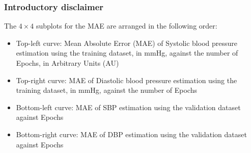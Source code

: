 \subsubsection{Introductory disclaimer}
The $4 \times 4$ subplots for the MAE are arranged in the following order:
\begin{itemize}
    \item Top-left curve: Mean Absolute Error (MAE) of Systolic blood pressure estimation using the training dataset, in mmHg, against the number of Epochs, in Arbitrary Units (AU)
    \item Top-right curve: MAE of Diastolic blood pressure estimation using the training dataset, in mmHg, against the number of Epochs
    \item Bottom-left curve: MAE of SBP estimation using the validation dataset against Epochs
    \item Bottom-right curve: MAE of DBP estimation using the validation dataset against Epochs
\end{itemize}

